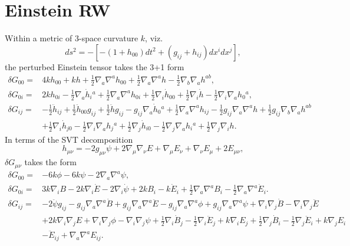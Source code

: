 \documentclass[10pt,letterpaper]{article}
\numberwithin{equation}{subsection}
\begin{document}
\section{Einstein RW}
Within a metric of 3-space curvature $k$, viz.
\begin{equation}
ds^2 = -\left[ -(1+h_{00})dt^2 + (g_{ij}+h_{ij})dx^i dx^j\right],
\end{equation}
the perturbed Einstein tensor takes the 3+1 form
\begin{align}
\delta G_{00}={}&4 k h_{00}
 + k h
 + \tfrac{1}{2} \nabla_{a}\nabla^{a}h_{00}
 + \tfrac{1}{2} \nabla_{a}\nabla^{a}h
 -  \tfrac{1}{2} \nabla_{b}\nabla_{a}h^{ab},
\\
\delta G_{0i}={}&2 k h_{0i}
 -  \tfrac{1}{2} \nabla_{a}\dot{h}_{i}{}^{a}
 + \tfrac{1}{2} \nabla_{a}\nabla^{a}h_{0i}
 + \tfrac{1}{2} \nabla_{i}\dot{h}_{00}
 + \tfrac{1}{2} \nabla_{i}\dot{h}
 -  \tfrac{1}{2} \nabla_{i}\nabla_{a}h_{0}{}^{a},
\\
\delta G_{ij}={}&- \tfrac{1}{2} \ddot{h}_{ij}
 + \tfrac{1}{2} \ddot{h}_{00} g_{ij}
 + \tfrac{1}{2} \ddot{h} g_{ij}
 -  g_{ij} \nabla_{a}\dot{h}_{0}{}^{a}
 + \tfrac{1}{2} \nabla_{a}\nabla^{a}h_{ij}
 -  \tfrac{1}{2} g_{ij} \nabla_{a}\nabla^{a}h
 + \tfrac{1}{2} g_{ij} \nabla_{b}\nabla_{a}h^{ab}\nonumber\\
& + \tfrac{1}{2} \nabla_{i}\dot{h}_{j0}
 -  \tfrac{1}{2} \nabla_{i}\nabla_{a}h_{j}{}^{a}
 + \tfrac{1}{2} \nabla_{j}\dot{h}_{i0}
 -  \tfrac{1}{2} \nabla_{j}\nabla_{a}h_{i}{}^{a}
 + \tfrac{1}{2} \nabla_{j}\nabla_{i}h.
\end{align}
In terms of the SVT decomposition
\begin{equation}
h_{\mu\nu} = -2 g_{\mu\nu}\psi + 2\nabla_\mu \nabla_\nu E + \nabla_\mu E_\nu +\nabla_\nu E_\mu + 2E_{\mu\nu},
\end{equation}
$\delta G_{\mu\nu}$ takes the form 
\begin{align}
\delta G_{00}={}&-6 k \phi
 - 6 k \psi
 - 2 \nabla_{a}\nabla^{a}\psi,
\\
\delta G_{0i}={}&3 k \nabla_{i}B
 - 2 k \nabla_{i}\dot{E}
 - 2 \nabla_{i}\dot{\psi}
+2 k B_{i}
 -  k \dot{E}_{i}
 + \tfrac{1}{2} \nabla_{a}\nabla^{a}B_{i}
 -  \tfrac{1}{2} \nabla_{a}\nabla^{a}\dot{E}_{i}.
\\
\delta G_{ij}={}&-2 \ddot{\psi} g_{ij}
 -  g_{ij} \nabla_{a}\nabla^{a}\dot{B}
 + g_{ij} \nabla_{a}\nabla^{a}\ddot{E}
 -  g_{ij} \nabla_{a}\nabla^{a}\phi
 + g_{ij} \nabla_{a}\nabla^{a}\psi
 + \nabla_{i}\nabla_{j}\dot{B}
 -  \nabla_{i}\nabla_{j}\ddot{E}\nonumber\\
& + 2 k \nabla_{i}\nabla_{j}E
 + \nabla_{i}\nabla_{j}\phi
 -  \nabla_{i}\nabla_{j}\psi
 +\tfrac{1}{2} \nabla_{i}\dot{B}_{j}
 -  \tfrac{1}{2} \nabla_{i}\ddot{E}_{j}
 + k \nabla_{i}E_{j}
 + \tfrac{1}{2} \nabla_{j}\dot{B}_{i}
 -  \tfrac{1}{2} \nabla_{j}\ddot{E}_{i}
 + k \nabla_{j}E_{i}\nonumber\\
& - \ddot{E}_{ij}
 + \nabla_{a}\nabla^{a}E_{ij}.
\end{align}
\end{document}
